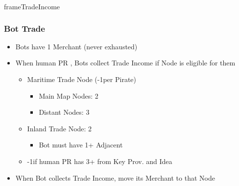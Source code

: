 \documentclass[10pt]{article}
\newlength{\fhActionCards} \setlength\fhActionCards{15\baselineskip}
\newlength{\fhTrade} \setlength\fhTrade{\calc{\textheight - \fhActionCards - \frameToFrameSpacing}}
\begin{document}
\begin{dynamiccontents*}{frameTradeIncome}
\begin{eubox}{\fhTrade}
{	\subsubsection*{Bot Trade }
	\begin{itemize}
		\item Bots have 1 Merchant (never exhausted)
		\item When human PR , Bots collect Trade Income if Node is eligible for them
		\begin{itemize}
			\item Maritime Trade Node (-1\botpower per Pirate)
			\begin{itemize}
				\item Main Map Nodes: 2\botpower
				\item Distant Nodes: 3\botpower
			\end{itemize}
			\item Inland Trade Node: 2\botpower
			\begin{itemize}
				\item Bot must have 1+ Adjacent \town
			\end{itemize}
			\item -1\botpower if human PR has 3+ \tradepower from Key Prov. and  Idea
		\end{itemize}
		\item When Bot collects Trade Income, move its Merchant to that Node	
	\end{itemize}
	}
\end{eubox}\end{dynamiccontents*}
\end{document}
